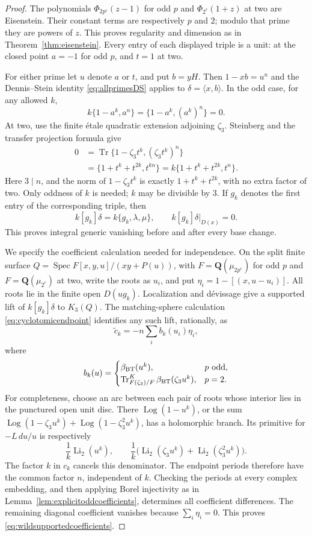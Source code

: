 \documentclass[11pt,a4paper]{article}
\theoremstyle{remark}
\newcommand{\Q}{\mathbf Q}
\newcommand{\Spec}{\operatorname{Spec}}
\begin{document}
\begin{proof}
The polynomials $\Phi_{2p^r}(z-1)$ for odd $p$ and
$\Phi_{2^r}(1+z)$ at two are Eisenstein.
Their constant terms are respectively $p$ and $2$; modulo that
prime they are powers of $z$. This proves regularity and dimension
as in Theorem~\ref{thm:eisenstein}.
Every entry of each displayed triple is a unit: at the closed
point $a=-1$ for odd $p$, and $t=1$ at two.

For either prime let $u$ denote $a$ or $t$, and put $b=yH$.
Then $1-xb=u^n$ and the Dennis--Stein identity
\eqref{eq:allprimesDS} applies to
$\delta=\langle x,b\rangle$.
In the odd case, for any allowed $k$,
\[
 k\{1-a^k,a^n\}=\{1-a^k,(a^k)^n\}=0.
\]
At two, use the finite \'etale quadratic extension adjoining
$\zeta_3$. Steinberg and the transfer projection formula give
\[
 \begin{split}
 0&=\operatorname{Tr}\{1-\zeta_3t^k,(\zeta_3t^k)^n\}\\
  &=\{1+t^k+t^{2k},t^{kn}\}
   =k\{1+t^k+t^{2k},t^n\}.
 \end{split}
\]
Here $3\mid n$, and the norm of $1-\zeta_3t^k$ is exactly
$1+t^k+t^{2k}$, with no extra factor of two.
Only oddness of $k$ is needed; $k$ may be divisible by $3$.
If $g_k$ denotes the first entry of the corresponding triple, then
\[
 k[g_k]\delta=k\{g_k,\lambda,\mu\},\qquad
 k[g_k]\delta|_{D(x)}=0.
\]
This proves integral generic vanishing before and after every base change.

We specify the coefficient calculation needed for independence.
On the split finite surface
$Q=\Spec F[x,y,u]/(xy+P(u))$, with $F=\Q(\mu_{2p^r})$ for
odd $p$ and $F=\Q(\mu_{2^r})$ at two, write the roots as $u_i$,
and put $\eta_i=1-[(x,u-u_i)]$.
All roots lie in the finite open $D(ug_k)$.
Localization and d\'evissage give a supported lift of
$k[g_k]\delta$ to $K_3(Q)$.
The matching-sphere calculation \eqref{eq:cyclotomicendpoint}
identifies any such lift, rationally, as
\begin{equation}\label{eq:wildsupportedcoefficients}
 \widetilde c_k=-n\sum_i b_k(u_i)\eta_i,
\end{equation}
where
\[
 b_k(u)=
 \begin{cases}
 \beta_{\rm BT}(u^k),&p\text{ odd},\\
 \operatorname{Tr}^{K}_{F(\zeta_3)/F}
       \beta_{\rm BT}(\zeta_3u^k),&p=2.
 \end{cases}
\]
For completeness, choose an arc between each pair of roots whose
interior lies in the punctured open unit disc. There
$\operatorname{Log}(1-u^k)$, or the sum
$\operatorname{Log}(1-\zeta_3u^k)+
 \operatorname{Log}(1-\zeta_3^2u^k)$, has a holomorphic branch.
Its primitive for $-L\,du/u$ is respectively
\[
 \frac1k\operatorname{Li}_2(u^k),\qquad
 \frac1k\bigl(\operatorname{Li}_2(\zeta_3u^k)
                  +\operatorname{Li}_2(\zeta_3^2u^k)\bigr).
\]
The factor $k$ in $c_k$ cancels this denominator.
The endpoint periods therefore have the common factor $n$,
independent of $k$. Checking the periods at every complex embedding,
and then applying Borel injectivity as in
Lemma~\ref{lem:explicitoddcoefficients}, determines all coefficient
differences. The remaining diagonal coefficient vanishes because
$\sum_i\eta_i=0$. This proves
\eqref{eq:wildsupportedcoefficients}.


\end{proof}
\end{document}
